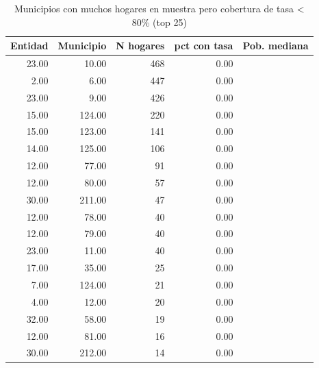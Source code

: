 \begin{table}[ht]
\centering
\caption{Municipios con muchos hogares en muestra pero cobertura de tasa < 80\% (top 25)} 
\label{tab:muni_M6_grandes_sin_tasa}
\begin{tabular}{rrrrr}
  \toprule
Entidad & Municipio & N hogares & pct con tasa & Pob. mediana \\ 
  \midrule
23.00 & 10.00 & 468 & 0.00 &  \\ 
  2.00 & 6.00 & 447 & 0.00 &  \\ 
  23.00 & 9.00 & 426 & 0.00 &  \\ 
  15.00 & 124.00 & 220 & 0.00 &  \\ 
  15.00 & 123.00 & 141 & 0.00 &  \\ 
  14.00 & 125.00 & 106 & 0.00 &  \\ 
  12.00 & 77.00 &  91 & 0.00 &  \\ 
  12.00 & 80.00 &  57 & 0.00 &  \\ 
  30.00 & 211.00 &  47 & 0.00 &  \\ 
  12.00 & 78.00 &  40 & 0.00 &  \\ 
  12.00 & 79.00 &  40 & 0.00 &  \\ 
  23.00 & 11.00 &  40 & 0.00 &  \\ 
  17.00 & 35.00 &  25 & 0.00 &  \\ 
  7.00 & 124.00 &  21 & 0.00 &  \\ 
  4.00 & 12.00 &  20 & 0.00 &  \\ 
  32.00 & 58.00 &  19 & 0.00 &  \\ 
  12.00 & 81.00 &  16 & 0.00 &  \\ 
  30.00 & 212.00 &  14 & 0.00 &  \\ 
   \bottomrule
\end{tabular}
\end{table}
